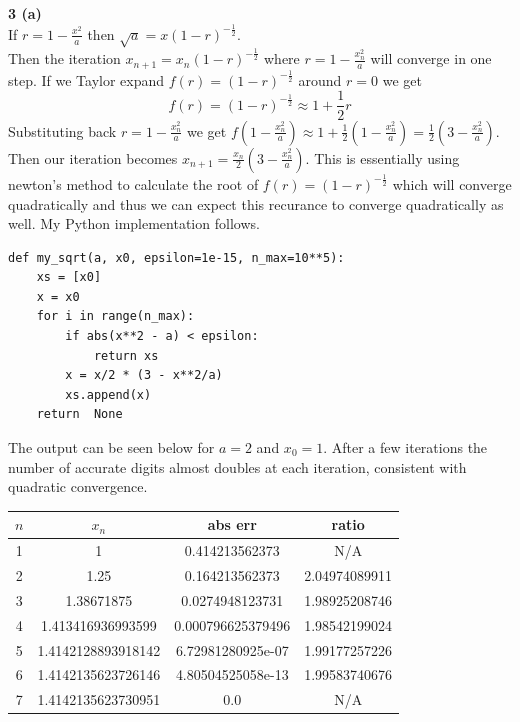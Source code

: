 \documentclass[12pt]{article}
\newcommand{\problem}[1]{\hspace{-4 ex} \large \textbf{#1}\\}
\begin{document}
\problem{3 (a)}
	If $r=1-\frac{x^2}{a}$ then $\sqrt{a} = x(1-r)^{-\frac{1}{2}}$. \\
	Then the iteration $x_{n+1} = x_n(1-r)^{-\frac{1}{2}}$ where $r=1-\frac{x_n^2}{a}$ will converge in one step. If we Taylor expand $f(r) = (1-r)^{-\frac{1}{2}}$ around $r=0$ we get
	$$
	f(r) = (1-r)^{-\frac{1}{2}} \approx 1 + \frac{1}{2}r
	$$
	Substituting back $r=1-\frac{x_n^2}{a}$ we get $f(1-\frac{x_n^2}{a}) \approx 1 + \frac{1}{2} (1-\frac{x_n^2}{a}) = \frac{1}{2}(3-\frac{x_n^2}{a})$. Then our iteration becomes $x_{n+1} = \frac{x_n}{2}(3-\frac{x_n^2}{a})$. This is essentially using newton's method to calculate the root of $f(r) = (1-r)^{-\frac{1}{2}}$ which will converge quadratically and thus we can expect this recurance to converge quadratically as well. My Python implementation follows.
	\singlespacing
	\begin{lstlisting}
def my_sqrt(a, x0, epsilon=1e-15, n_max=10**5):
	xs = [x0]
	x = x0
	for i in range(n_max):
		if abs(x**2 - a) < epsilon:
			return xs
		x = x/2 * (3 - x**2/a)
		xs.append(x)
	return  None
	\end{lstlisting}\doublespacing
	
	The output can be seen below for $a=2$ and $x_0=1$. After a few iterations the number of accurate digits almost doubles at each iteration, consistent with quadratic convergence.
	
	\begin{center}
		\begin{tabular}{|c|c|c|c|}
			\hline
			$n$&$x_n$&abs err&ratio\\ \hline
			1&1&0.414213562373&N/A\\ \hline
			2&1.25&0.164213562373&2.04974089911\\ \hline
			3&1.38671875&0.0274948123731&1.98925208746\\ \hline
			4&1.413416936993599&0.000796625379496&1.98542199024\\ \hline
			5&1.4142128893918142&6.72981280925e-07&1.99177257226\\ \hline
			6&1.4142135623726146&4.80504525058e-13&1.99583740676\\ \hline
			7&1.4142135623730951&0.0&N/A\\ \hline
		\end{tabular}
	\end{center}
	
\end{document}
